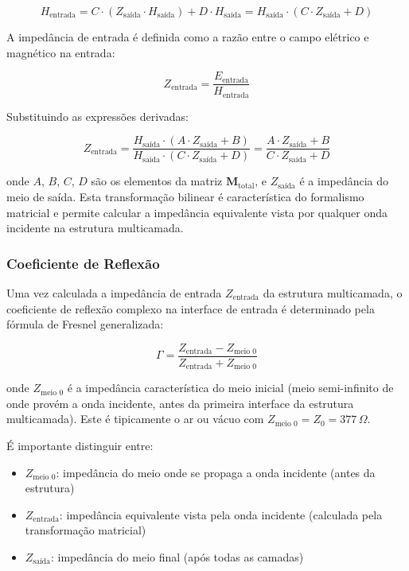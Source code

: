 \documentclass[11pt,a4paper]{article}
\begin{document}
\begin{equation}
H_{\text{entrada}} = C \cdot (Z_{\text{saída}} \cdot H_{\text{saída}}) + D \cdot H_{\text{saída}} = H_{\text{saída}} \cdot (C \cdot Z_{\text{saída}} + D)
\end{equation}

A impedância de entrada é definida como a razão entre o campo elétrico e magnético na entrada:

\begin{equation}
Z_{\text{entrada}} = \frac{E_{\text{entrada}}}{H_{\text{entrada}}}
\end{equation}

Substituindo as expressões derivadas:

\begin{equation}
Z_{\text{entrada}} = \frac{H_{\text{saída}} \cdot (A \cdot Z_{\text{saída}} + B)}{H_{\text{saída}} \cdot (C \cdot Z_{\text{saída}} + D)} = \frac{A \cdot Z_{\text{saída}} + B}{C \cdot Z_{\text{saída}} + D}
\end{equation}

onde $A$, $B$, $C$, $D$ são os elementos da matriz $\mathbf{M}_{\text{total}}$, e $Z_{\text{saída}}$ é a impedância do meio de saída. Esta transformação bilinear é característica do formalismo matricial e permite calcular a impedância equivalente vista por qualquer onda incidente na estrutura multicamada.

\subsubsection{Coeficiente de Reflexão}

Uma vez calculada a impedância de entrada $Z_{\text{entrada}}$ da estrutura multicamada, o coeficiente de reflexão complexo na interface de entrada é determinado pela fórmula de Fresnel generalizada:

\begin{equation}
\Gamma = \frac{Z_{\text{entrada}} - Z_{\text{meio 0}}}{Z_{\text{entrada}} + Z_{\text{meio 0}}}
\end{equation}

onde $Z_{\text{meio 0}}$ é a impedância característica do meio inicial (meio semi-infinito de onde provém a onda incidente, antes da primeira interface da estrutura multicamada). Este é tipicamente o ar ou vácuo com $Z_{\text{meio 0}} = Z_0 = 377\,\Omega$.

É importante distinguir entre:
\begin{itemize}
\item $Z_{\text{meio 0}}$: impedância do meio onde se propaga a onda incidente (antes da estrutura)
\item $Z_{\text{entrada}}$: impedância equivalente vista pela onda incidente (calculada pela transformação matricial)
\item $Z_{\text{saída}}$: impedância do meio final (após todas as camadas)
\end{itemize}
\end{document}
